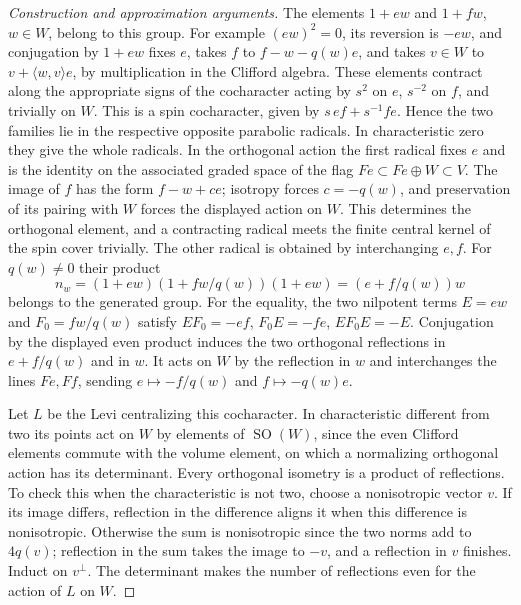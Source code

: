 \documentclass[11pt,a4paper,openany,oneside]{book}
\theoremstyle{resultstyle}
\theoremstyle{definition}
\numberwithin{equation}{chapter}
\begin{document}
\begin{proof}[Construction and approximation arguments]
The elements \(1+ew\) and \(1+fw\), \(w\in W\), belong to
this group. For example \((ew)^2=0\), its reversion is
\(-ew\), and conjugation by \(1+ew\) fixes \(e\), takes
\(f\) to \(f-w-q(w)e\), and takes \(v\in W\) to
\(v+\langle w,v\rangle e\), by multiplication in the
Clifford algebra. These elements contract along the
appropriate signs of the cocharacter acting by \(s^2\)
on \(e\), \(s^{-2}\) on \(f\), and trivially on \(W\).
This is a spin cocharacter, given by \(s\,ef+s^{-1}fe\).
Hence the two families lie in the respective opposite
parabolic radicals. In characteristic zero they give the
whole radicals. In the orthogonal action the first radical
fixes \(e\) and is the identity on the associated graded space
of the flag \(Fe\subset Fe\oplus W\subset V\). The image
of \(f\) has the form \(f-w+ce\); isotropy forces
\(c=-q(w)\), and preservation of its pairing with \(W\)
forces the displayed action on \(W\). This determines the
orthogonal element, and a contracting radical meets the
finite central kernel of the spin cover trivially. The other
radical is obtained by interchanging \(e,f\).
For \(q(w)\ne0\) their product
\[
 n_w=(1+ew)(1+fw/q(w))(1+ew)=(e+f/q(w))w
\]
belongs to the generated group. For the equality, the two
nilpotent terms \(E=ew\) and \(F_0=fw/q(w)\) satisfy
\(EF_0=-ef\), \(F_0E=-fe\), \(EF_0E=-E\).
Conjugation by the displayed even product induces the
two orthogonal reflections in \(e+f/q(w)\) and in \(w\).
It acts on \(W\) by the reflection in \(w\) and
interchanges the lines \(Fe,Ff\), sending
\(e\mapsto-f/q(w)\) and \(f\mapsto-q(w)e\).

Let \(L\) be the Levi centralizing this cocharacter.
In characteristic different from two its points act on
\(W\) by elements of \(\operatorname{SO}(W)\), since
the even Clifford elements commute with the volume
element, on which a normalizing orthogonal action has
its determinant. Every orthogonal isometry is a product
of reflections. To check this when the characteristic is
not two, choose a nonisotropic vector \(v\). If its image
differs, reflection in the difference aligns it when this
difference is nonisotropic. Otherwise the sum is
nonisotropic since the two norms add to \(4q(v)\);
reflection in the sum takes the image to \(-v\), and a
reflection in \(v\) finishes. Induct on \(v^\perp\).
The determinant makes the number of reflections even
for the action of \(L\) on \(W\).


\end{proof}
\end{document}
